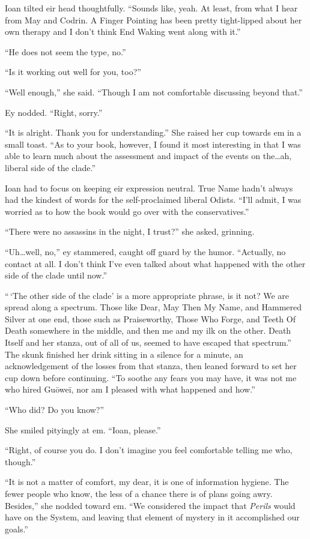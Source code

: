 Ioan tilted eir head thoughtfully. ``Sounds like, yeah. At least, from what I hear from May and Codrin. A Finger Pointing has been pretty tight-lipped about her own therapy and I don't think End Waking went along with it.''

``He does not seem the type, no.''

``Is it working out well for you, too?''

``Well enough,'' she said. ``Though I am not comfortable discussing beyond that.''

Ey nodded. ``Right, sorry.''

``It is alright. Thank you for understanding.'' She raised her cup towards em in a small toast. ``As to your book, however, I found it most interesting in that I was able to learn much about the assessment and impact of the events on the\ldots ah, liberal side of the clade.''

Ioan had to focus on keeping eir expression neutral. True Name hadn't always had the kindest of words for the self-proclaimed liberal Odists. ``I'll admit, I was worried as to how the book would go over with the conservatives.''

``There were no assassins in the night, I trust?'' she asked, grinning.

``Uh\ldots well, no,'' ey stammered, caught off guard by the humor. ``Actually, no contact at all. I don't think I've even talked about what happened with the other side of the clade until now.''

``\,`The other side of the clade' is a more appropriate phrase, is it not? We are spread along a spectrum. Those like Dear, May Then My Name, and Hammered Silver at one end, those such as Praiseworthy, Those Who Forge, and Teeth Of Death somewhere in the middle, and then me and my ilk on the other. Death Itself and her stanza, out of all of us, seemed to have escaped that spectrum.'' The skunk finished her drink sitting in a silence for a minute, an acknowledgement of the losses from that stanza, then leaned forward to set her cup down before continuing. ``To soothe any fears you may have, it was not me who hired Guōweī, nor am I pleased with what happened and how.''

``Who did? Do you know?''

She smiled pityingly at em. ``Ioan, please.''

``Right, of course you do. I don't imagine you feel comfortable telling me who, though.''

``It is not a matter of comfort, my dear, it is one of information hygiene. The fewer people who know, the less of a chance there is of plans going awry. Besides,'' she nodded toward em. ``We considered the impact that \emph{Perils} would have on the System, and leaving that element of mystery in it accomplished our goals.''

